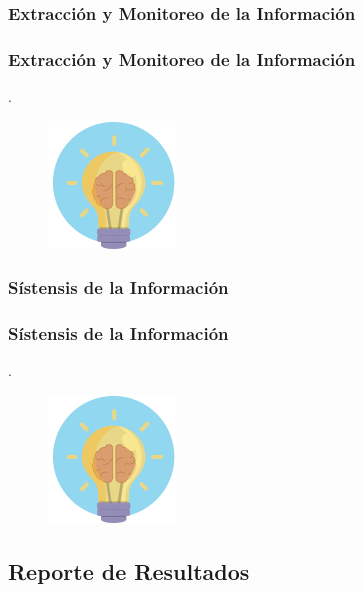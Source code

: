 \documentclass{beamer}
\begin{document}
\subsubsection{Extracción y Monitoreo de la Información} %
\begin{frame}
    \frametitle{Extracción y Monitoreo de la Información}
    .
	\begin{figure}
		\begin{center}
			\includegraphics[scale=0.45]{images/2icons/need.png}
			\label{student}
		\end{center}
	\end{figure}
\end{frame}
\subsubsection{Sístensis de la Información} %
\begin{frame}
    \frametitle{Sístensis de la Información}
    .
	\begin{figure}
		\begin{center}
			\includegraphics[scale=0.45]{images/2icons/need.png}
			\label{student}
		\end{center}
	\end{figure}
\end{frame}

\subsection{Reporte de Resultados} %
\end{document}
